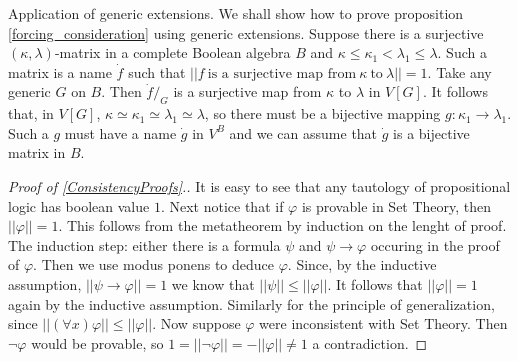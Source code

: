 \begin{example}{Application of generic extensions.} We shall show how to prove proposition \ref{forcing_consideration} using generic extensions.
Suppose there is a surjective $(\kappa,\lambda)$-matrix in a complete Boolean algebra $B$ and $\kappa\leq\kappa_1<\lambda_1\leq\lambda$.
Such a matrix is a name $\dot{f}$ such that
$||f\ \mbox{is a surjective map from}\ \kappa\ \mbox{to}\ \lambda||=1$. Take any generic $G$ on $B$. Then $\dot{f}/_{G}$ is a surjective
map from $\kappa$ to $\lambda$ in $V[G]$. It follows that, in $V[G]$, $\kappa\simeq\kappa_1\simeq\lambda_1\simeq\lambda$, so there must
be a bijective mapping $g:\kappa_1\to\lambda_1$. Such a $g$ must have a name $\dot{g}$ in $V^B$ and we can assume that $\dot{g}$ is a
bijective matrix in $B$.
\end{example}

\begin{proof}[Proof of \ref{ConsistencyProofs}.] \label{ConsistencyProofsproof}
 It is easy to see that any tautology of propositional logic has boolean value $1$.
 Next notice that if $\varphi$ is provable in Set Theory, then $||\varphi||=1$. This follows from the metatheorem by induction on the lenght of proof.
 The induction step: either there is a formula $\psi$ and $\psi\rightarrow\varphi$ occuring in the proof of $\varphi$. Then we use modus ponens to deduce
 $\varphi$. Since, by the inductive assumption, $||\psi\rightarrow\varphi||=1$ we know that $||\psi||\leq||\varphi||$. It follows that $||\varphi||=1$ again
 by the inductive assumption. Similarly for the principle of generalization, since $||(\forall x)\varphi||\leq||\varphi||$.
 Now suppose $\varphi$ were inconsistent with Set Theory. Then $\neg \varphi$ would be provable, so $1=||\neg\varphi||=-||\varphi||\neq 1$ a contradiction.
 \end{proof}

